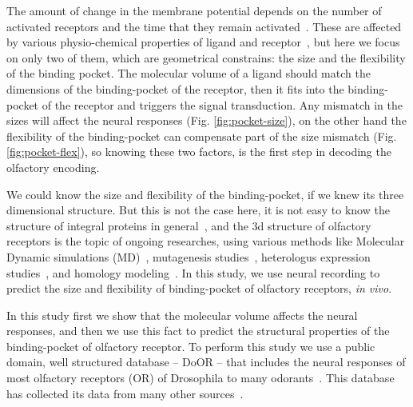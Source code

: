 \documentclass[11pt]{paper} %
\begin{document}
The amount of change in the membrane potential depends on the number of activated receptors and the time that they remain activated~\cite{}.
These are affected by various physio-chemical properties of ligand and receptor~\cite{}, 
but here we focus on only two of them, which are geometrical constrains: the size and the flexibility of the binding pocket.
The molecular volume of a ligand should match the dimensions of the binding-pocket of the receptor,
then it fits into the binding-pocket of the receptor and triggers the signal transduction. 
Any mismatch in the sizes will affect the neural responses (Fig. \ref{fig:pocket-size}), 
on the other hand the flexibility of the binding-pocket can compensate part of the size mismatch (Fig. \ref{fig:pocket-flex}),
so knowing these two factors, is the first step in decoding the olfactory encoding.

We could know the size and flexibility of the binding-pocket, if we knew its three dimensional structure.
But this is not the case here, it is not easy to know the structure of integral proteins in general~\cite{}, 
and the 3d structure of olfactory receptors is the topic of ongoing researches, 
using various methods like Molecular Dynamic simulations (MD)~\cite{}, 
mutagenesis studies~\cite{}, heterologus expression studies~\cite{}, and homology modeling~\cite{}.
In this study, we use neural recording to predict the size and flexibility of binding-pocket of olfactory receptors, {\it in vivo}.

In this study first we show that the molecular volume affects the neural responses, 
and then we use this fact to predict the structural properties of the binding-pocket of olfactory receptor.
To perform this study we use a public domain, well structured database -- DoOR -- 
that includes the neural responses of most olfactory receptors (OR) of Drosophila to many odorants~\cite{DoOR2010}. 
This database has collected its data from many other sources~\cite{}.




\end{document}
